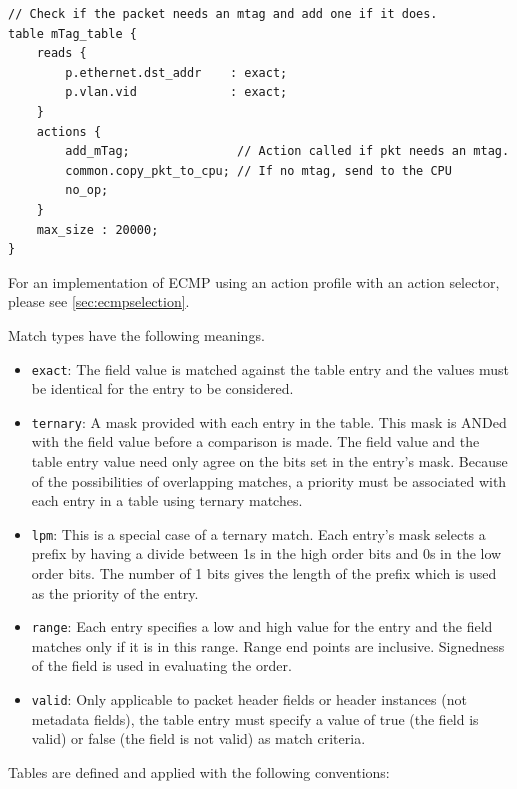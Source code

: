 \documentclass[12pt]{article}
\begin{document}
\begin{lstlisting}[style=P4style]
// Check if the packet needs an mtag and add one if it does.
table mTag_table {
    reads {
        p.ethernet.dst_addr    : exact;
        p.vlan.vid             : exact;
    }
    actions {
        add_mTag;               // Action called if pkt needs an mtag.
        common.copy_pkt_to_cpu; // If no mtag, send to the CPU
        no_op;
    }
    max_size : 20000;
}
\end{lstlisting}

For an implementation of ECMP using an action profile with an action selector,
please see \ref{sec:ecmpselection}.


Match types have the following meanings.

\begin{itemize}
\item
\texttt{exact}: The field value is matched against the table entry and the values 
must be identical for the entry to be considered.
\item
\texttt{ternary}:  A mask provided with each entry in the table. This mask is ANDed 
with the field value before a comparison is made.  The field value and the 
table entry value need only agree on the bits set in the entry's mask.  Because 
of the possibilities of overlapping matches, a priority must be associated 
with each entry in a table using ternary matches.
\item
\texttt{lpm}:  This is a special case of a ternary match. Each entry's mask selects 
a prefix by having a divide between 1s in the high order bits and 0s in the 
low order bits. The number of 1 bits gives the length of the prefix which 
is used as the priority of the entry.
\item
\texttt{range}: Each entry specifies a low and high value for the entry and the field 
matches only if it is in this range. Range end points are inclusive. Signedness 
of the field is used in evaluating the order.
\item
\texttt{valid}: Only applicable to packet header fields or header instances (not metadata 
fields), the table entry must specify a value of true (the field is valid) 
or false (the field is not valid) as match criteria.
\end{itemize}


Tables are defined and applied with the following conventions:
\end{document}

